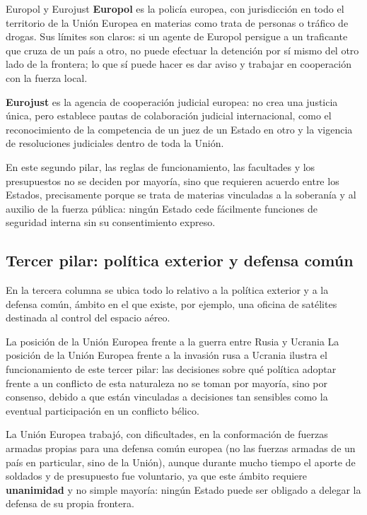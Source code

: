 \documentclass[12pt,oneside]{book}
\begin{document}
\begin{example}{Europol y Eurojust}
\textbf{Europol} es la policía europea, con jurisdicción en todo el territorio de la Unión Europea en materias como trata de personas o tráfico de drogas. Sus límites son claros: si un agente de Europol persigue a un traficante que cruza de un país a otro, no puede efectuar la detención por sí mismo del otro lado de la frontera; lo que sí puede hacer es dar aviso y trabajar en cooperación con la fuerza local.

\textbf{Eurojust} es la agencia de cooperación judicial europea: no crea una justicia única, pero establece pautas de colaboración judicial internacional, como el reconocimiento de la competencia de un juez de un Estado en otro y la vigencia de resoluciones judiciales dentro de toda la Unión.
\end{example}

En este segundo pilar, las reglas de funcionamiento, las facultades y los presupuestos no se deciden por mayoría, sino que requieren acuerdo entre los Estados, precisamente porque se trata de materias vinculadas a la soberanía y al auxilio de la fuerza pública: ningún Estado cede fácilmente funciones de seguridad interna sin su consentimiento expreso.

\subsection{Tercer pilar: política exterior y defensa común}

En la tercera columna se ubica todo lo relativo a la política exterior y a la defensa común, ámbito en el que existe, por ejemplo, una oficina de satélites destinada al control del espacio aéreo.

\begin{example}{La posición de la Unión Europea frente a la guerra entre Rusia y Ucrania}
La posición de la Unión Europea frente a la invasión rusa a Ucrania ilustra el funcionamiento de este tercer pilar: las decisiones sobre qué política adoptar frente a un conflicto de esta naturaleza no se toman por mayoría, sino por consenso, debido a que están vinculadas a decisiones tan sensibles como la eventual participación en un conflicto bélico.
\end{example}

La Unión Europea trabajó, con dificultades, en la conformación de fuerzas armadas propias para una defensa común europea (no las fuerzas armadas de un país en particular, sino de la Unión), aunque durante mucho tiempo el aporte de soldados y de presupuesto fue voluntario, ya que este ámbito requiere \textbf{unanimidad} y no simple mayoría: ningún Estado puede ser obligado a delegar la defensa de su propia frontera.
\end{document}
